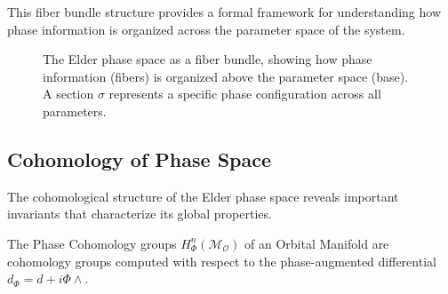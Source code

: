 \begin{theorem}
\begin{definition}
\begin{definition}
\begin{enumerate}
\begin{definition}
This fiber bundle structure provides a formal framework for understanding how phase information is organized across the parameter space of the system.

\begin{figure}[h]
\centering
{}
\caption{The Elder phase space as a fiber bundle, showing how phase information (fibers) is organized above the parameter space (base). A section $\sigma$ represents a specific phase configuration across all parameters.}
\label{fig:phase_fiber_bundle}
\end{figure}

\subsection{Cohomology of Phase Space}

The cohomological structure of the Elder phase space reveals important invariants that characterize its global properties.

\begin{definition}
The Phase Cohomology groups $H^n_{\Phi}(\mathcal{M}_{\mathcal{O}})$ of an Orbital Manifold are cohomology groups computed with respect to the phase-augmented differential $d_{\Phi} = d + i\Phi \wedge$.
\end{definition}


\end{definition}
\end{enumerate}
\end{definition}
\end{definition}
\end{theorem}
